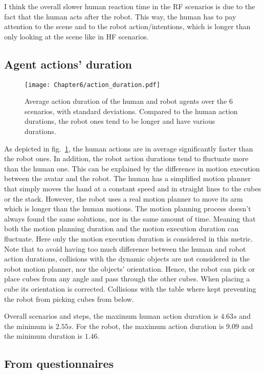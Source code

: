 I think the overall slower human reaction time in the RF scenarios is due to the fact that the human acts after the robot. This way, the human has to pay attention to the scene and to the robot action/intentions, which is longer than only looking at the scene like in HF scenarios.   


\subsection*{Agent actions' duration}

\begin{figure}[h]
    \center
    \texttt{[image: Chapter6/action\_duration.pdf]}
    \caption{Average action duration of the human and robot agents over the 6 scenarios, with standard deviations. Compared to the human action durations, the robot ones tend to be longer and have various durations.}
    \label{fig:action_durations}
\end{figure}

As depicted in fig.~\ref{fig:action_durations}, the human actions are in average significantly faster than the robot ones. In addition, the robot action durations tend to fluctuate more than the human one. This can be explained by the difference in motion execution between the avatar and the robot. The human has a simplified motion planner that simply moves the hand at a constant speed and in straight lines to the cubes or the stack. However, the robot uses a real motion planner to move its arm which is longer than the human motions. The motion planning process doesn't always found the same solutions, nor in the same amount of time. Meaning that both the motion planning duration and the motion execution duration can fluctuate. Here only the motion execution duration is considered in this metric. Note that to avoid having too much difference between the human and robot action durations, collisions with the dynamic objects are not considered in the robot motion planner, nor the objects' orientation. Hence, the robot can pick or place cubes from any angle and pass through the other cubes. When placing a cube its orientation is corrected. Collisions with the table where kept preventing the robot from picking cubes from below.  

Overall scenarios and steps, the maximum human action duration is $4.63s$ and the minimum is  $2.55s$. For the robot, the maximum action duration is $9.09$ and the minimum duration is $1.46$.

\subsection{From questionnaires}

